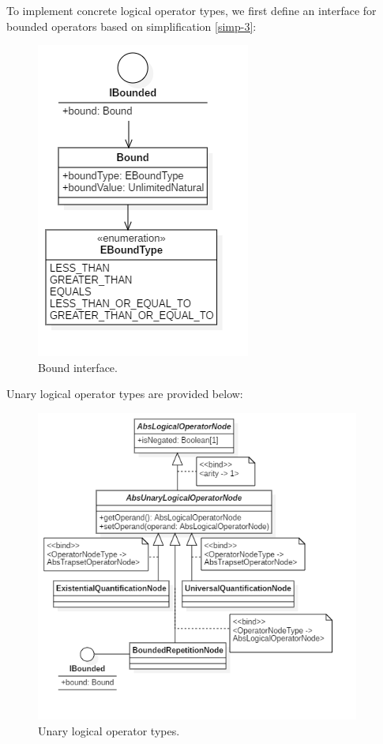 \documentclass[12pt,oneside,a4paper,notitlepage]{report}
\begin{document}
	\newpage

	\par To implement concrete logical operator types, we first define an interface for bounded operators based on simplification \ref{simp-3}:

	\begin{figure}[h]
		\begin{center}
			\includegraphics{Models/BoundModifier}
		\end{center}
		\caption{Bound interface.}
		\label{fig:bound-interface}
	\end{figure}

	\newpage

	\par Unary logical operator types are provided below:
	
	\begin{figure}[h]
		\begin{center}
			\includegraphics[width=0.95\textwidth]
			{Models/LogicalOperatorTypesUnary}
		\end{center}
		\caption{Unary logical operator types.}
		\label{fig:unary-logical-types}
	\end{figure}
\end{document}
